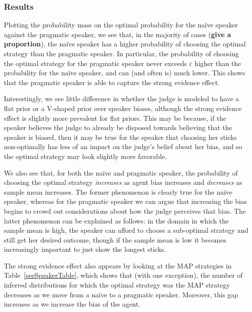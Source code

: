 \documentclass[10pt,letterpaper]{article}
\begin{document}
\subsubsection{Results}
Plotting the probability mass on the optimal probability for the na\"ive speaker against the pragmatic speaker, we see that,
in the majority of cases (\textbf{give a proportion}), the na\"ive speaker has a higher probability of choosing the optimal 
strategy than the pragmatic speaker. In particular, the probability of choosing the optimal strategy for the pragmatic speaker never
exceeds $\varepsilon$ higher than the probability for the na\"ive speaker, and can (and often is) much lower. This shows that the 
pragmatic speaker is able to capture the strong evidence effect.

Interestingly, we see little difference in whether the judge is modeled to have a flat prior or a V-shaped prior over speaker biases,
although the strong evidence effect is slightly more prevalent for flat priors. This may be because, if the speaker believes the judge 
to already be disposed towards believing that the speaker is biased, then it may be true for the speaker that choosing her sticks 
non-optimally has less of an impact on the judge's belief about her bias, and so the optimal strategy may look slightly more 
favorable.

We also see that, for both the na\"ive and pragmatic speaker, the probability of choosing the optimal strategy \textit{increases} as
agent bias increases and \textit{decreases} as sample mean increases. The former phenomenon is clearly true for the na\"ive speaker,
whereas for the pragmatic speaker we can argue that increasing the bias begins to crowd out considerations about how the judge perceives
that bias. The latter phenomenon can be explained as follows: in the domain in which the sample mean is high, the speaker
can afford to choose a sub-optimal strategy and still get her desired outcome, though if the sample mean is low it becomes 
increasingly important to just show the longest sticks.

The strong evidence effect also appears by looking at the MAP strategies in Table~\ref{seeSpeakerTable}, which shows that (with one exception),
the number of inferred distributions for which the optimal strategy was the MAP strategy decreases as we move from a 
na\"ive to a pragmatic speaker. Moreover, this gap increases as we increase the bias of the agent.
\end{document}
